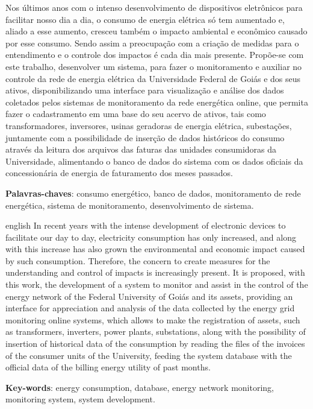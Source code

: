 \setlength{\absparsep}{18pt} %
\begin{resumo}
 Nos últimos anos com o intenso desenvolvimento de dispositivos eletrônicos para facilitar nosso dia a dia, o consumo de energia elétrica só tem aumentado e, aliado a esse aumento, cresceu também o impacto ambiental e econômico causado por esse consumo. Sendo assim a preocupação com a criação de medidas para o entendimento e o controle dos impactos é cada dia mais presente. Propõe-se com este trabalho, desenvolver um sistema, para fazer o monitoramento e auxiliar no controle da rede de energia elétrica da Universidade Federal de Goiás e dos seus ativos, disponibilizando uma interface para visualização e análise dos dados coletados pelos sistemas de monitoramento da rede energética online, que permita fazer o cadastramento em uma base do seu acervo de ativos, tais como transformadores, inversores, usinas geradoras de energia elétrica, subestações, juntamente com a possibilidade de inserção de dados históricos do consumo através da leitura dos arquivos das faturas das unidades consumidoras da Universidade, alimentando o banco de dados do sistema com os dados oficiais da concessionária de energia de faturamento dos meses passados. 

 \textbf{Palavras-chaves}: consumo energético, banco de dados, monitoramento de rede energética, sistema de monitoramento, desenvolvimento de sistema.
\end{resumo}

\begin{resumo}[Abstract]
 \begin{otherlanguage*}{english}
   In recent years with the intense development of electronic devices to facilitate our day to day, electricity consumption has only increased, and along with this increase has also grown the environmental and economic impact caused by such consumption. Therefore, the concern to create measures for the understanding and control of impacts is increasingly present. It is proposed, with this work, the development of a system to monitor and assist in the control of the energy network of the Federal University of Goiás and its assets, providing an interface for appreciation and analysis of the data collected by the energy grid monitoring online systems, which allows to make the registration of assets, such as transformers, inverters, power plants, substations, along with the possibility of insertion of historical data of the consumption by reading the files of the invoices of the consumer units of the University, feeding the system database with the official data of the billing energy utility of past months.

   \vspace{\onelineskip}
 
   \noindent 
   \textbf{Key-words}: energy consumption, database, energy network monitoring, monitoring system, system development.
 \end{otherlanguage*}
\end{resumo}